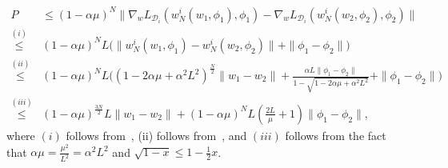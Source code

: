 \documentclass{osudissert96}
\begin{document}
\begin{align}\label{eq:pss}
P &\leq (1-\alpha \mu)^{N}\big\|\nabla_{w} L_{\mathcal{D}_i} (w_{N}^i(w_1,\phi_1),\phi_1)-\nabla_{w} L_{\mathcal{D}_i} (w_{N}^i(w_2,\phi_2),\phi_2)\big\| \nonumber
\\\overset{(i)}\leq&(1-\alpha \mu)^{N} L\big(\|w_{N}^i(w_1,\phi_1)-w_{N}^i(w_2,\phi_2)\| +\|\phi_1-\phi_2\|\big) \nonumber
\\\overset{(ii)}\leq& (1-\alpha\mu)^{N}L\Big( (1-2\alpha\mu+\alpha^2L^2)^{\frac{N}{2}}\|w_1-w_2\| + \frac{\alpha L\|\phi_1-\phi_2\|}{1-\sqrt{1-2\alpha\mu+\alpha^2L^2}} + \|\phi_1-\phi_2\|  \Big) \nonumber
\\\overset{(iii)}\leq &  (1-\alpha\mu)^{\frac{3N}{2}} L \|w_1-w_2\| +  (1-\alpha\mu)^NL\left(\frac{2L}{\mu}+1\right)\|\phi_1-\phi_2\|,
\end{align}
where $(i)$ follows from~, (ii) follows from~, and $(iii)$ follows from the fact that  $\alpha\mu = \frac{\mu^2}{L^2} =\alpha^2L^2$ and $\sqrt{1-x}\leq 1-\frac{1}{2}x$. 
\end{document}
